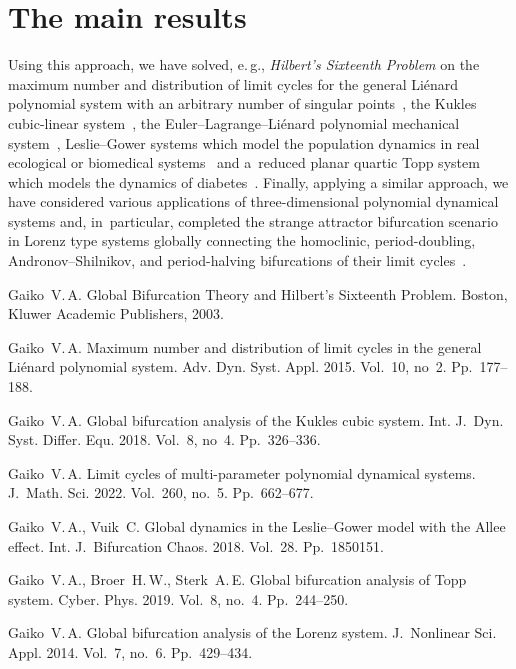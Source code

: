 \documentclass[12pt]{llncs}
\begin{document}
\section{The main results}

Using this approach, we have solved, e.\,g., {\it Hilbert's Sixteenth Problem}
on the maximum number and distribution of limit cycles for the general Li\'{e}nard
polynomial system with an arbitrary number of singular points~\cite{gaiko2}, the
Kukles cubic-linear system~\cite{gaiko3}, the Euler--Lagrange--Li\'{e}nard polynomial
mechanical system~\cite{gaiko4}, Leslie--Gower systems which model the population dynamics
in real ecological or biomedical systems~\cite{gaiko5} and a~reduced planar quartic Topp system
which models the dy\-na\-mics of diabetes~\cite{gaiko6}. Finally, applying a similar approach,
we have considered various applications of three-dimensional polynomial dynamical systems and,
in~particular, completed the strange attractor bifurcation scenario in Lorenz type systems
globally connecting the homoclinic, period-doubling, Andronov--Shilnikov, and period-halving
bifurcations of their limit cycles~\cite{gaiko7}.

\begin{thebibliography}{9}
Gaiko~V.\,A. Global Bifurcation Theory and Hilbert's Sixteenth Problem. Boston, Kluwer
Academic Publishers, 2003.

Gaiko~V.\,A. Maximum number and distribution of limit cycles in the general Li\'{e}nard
polynomial system. Adv. Dyn. Syst. Appl. 2015. Vol.~10, no~2. Pp.~177--188.

Gaiko~V.\,A. Global bifurcation analysis of the Kukles cubic system. Int. J.~Dyn. Syst.
Differ. Equ. 2018. Vol.~8, no~4. Pp.~326--336.

Gaiko~V.\,A. Limit cycles of multi-parameter polynomial dynamical systems. J.~Math. Sci.
2022. Vol.~260, no.~5. Pp.~662--677.

Gaiko~V.\,A., Vuik~C. Global dynamics in the Leslie--Gower model with the Allee effect.
Int. J.~Bifurcation Chaos. 2018. Vol.~28. Pp.~1850151.

Gaiko~V.\,A., Broer~H.\,W., Sterk~A.\,E. Global bifurcation analysis of Topp system.
Cyber. Phys. 2019. Vol.~8, no.~4. Pp.~244--250.

Gaiko~V.\,A. Global bifurcation analysis of the Lorenz system. J.~Nonlinear Sci.
Appl. 2014. Vol.~7, no.~6. Pp.~429--434.

\end{thebibliography}
\end{document}
